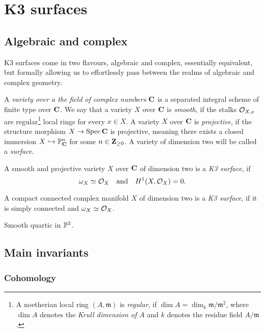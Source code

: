 \section{K3 surfaces}

\subsection{Algebraic and complex}

K3 surfaces come in two flavours, algebraic and complex, essentially equivalent, but formally allowing us to effortlessly pass between the realms of algebraic and complex geometry. 

A \emph{variety over a the field of complex numbers $\mathbf C$} is a separated integral scheme of finite type over $\mathbf C$. We say that a variety $X$ over $\mathbf C$ is \emph{smooth}, if the stalks ${\mathcal{O}_{X, x}}$ are regular\footnote{A noetherian local ring $(A, \mathfrak{m})$ is \emph{regular}, if $\dim A = \dim_k \mathfrak{m}/\mathfrak{m}^2$, where $\dim A$ denotes the \emph{Krull dimension of $A$} and $k$ denotes the residue field $A/\mathfrak{m}$.} local rings for every $x \in X$. A variety $X$ over $\mathbf C$ is \emph{projective}, if the structure morphism $X \to \operatorname{Spec}\mathbf C$ is projective, meaning there exists a closed immersion $X \hookrightarrow \mathbb P^n_\mathbf C$ for some $n \in \mathbf Z_{\geq 0}$. A variety of dimension two will be called a \emph{surface}. 

\begin{definition}
    A smooth and projective variety $X$ over $\mathbf C$ of dimension two is a \emph{K3 surface}, if 
    \[
        \omega_X \simeq {\mathcal{O}_{X}} \quad \text{and} \quad H^{1}(X, {\mathcal{O}_{X}}) = 0.
    \]
\end{definition}



\begin{definition}
    A compact connected complex manifold $X$ of dimension two is a \emph{K3 surface}, if it is simply connected and $\omega_X \simeq {\mathcal{O}_{X}}$.
\end{definition}

\begin{example}
    Smooth quartic in $\mathbb P^3$.
\end{example}

\subsection{Main invariants}

\subsubsection{Cohomology}
